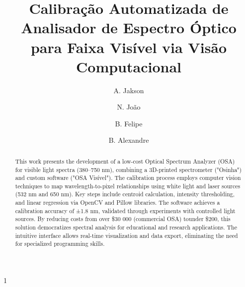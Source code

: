 \documentclass[a4paper]{ifacconf}
\def\portugues{1}
\def\portugues{0}
\begin{document}
	
	
\if\portugues1

% 
	
\begin{frontmatter}

\title{Calibração Automatizada de Analisador de Espectro Óptico para Faixa Visível via Visão Computacional} 



\author[First]{A. Jakson} 
\author[Second]{N. João} 
\author[Third]{B. Felipe}
\author[Fourth]{B. Alexandre}

\address[First]{Faculdade de Engenharia Elétrica, Universidade Federal de Juiz de Fora, MG, (e-mail: jakson.almeida@estudante.ufjf.br).}
\address[Second]{Faculdade de Engenharia Elétrica, Universidade Federal de Juiz de Fora, MG, (e-mail: joao.nascimento@estudante.ufjf.br).}
\address[Third]{Faculdade de Engenharia Elétrica, Universidade Federal de Juiz de Fora, MG, (e-mail: felipe.barino@ufjf.br)}
\address[Fourth]{Faculdade de Engenharia Elétrica, Universidade Federal de Juiz de Fora, MG, (e-mail:alexandre.bessa@ufjf.br).}


\renewcommand{\abstractname}{{\bf Abstract:~}}
\begin{abstract}                %
This work presents the development of a low-cost Optical Spectrum Analyzer (OSA) for visible light spectra (380–750 nm), combining a 3D-printed spectrometer ("Osinha") and custom software ("OSA Visível"). The calibration process employs computer vision techniques to map wavelength-to-pixel relationships using white light and laser sources (532 nm and 650 nm). Key steps include centroid calculation, intensity thresholding, and linear regression via OpenCV and Pillow libraries. The software achieves a calibration accuracy of ±1.8 nm, validated through experiments with controlled light sources. By reducing costs from over \$30 000 (commercial OSA) tounder \$200, this solution democratizes spectral analysis for educational and research applications. The intuitive interface allows real-time visualization and data export, eliminating the need for specialized programming skills.


\end{abstract}
\end{frontmatter}
\end{document}
